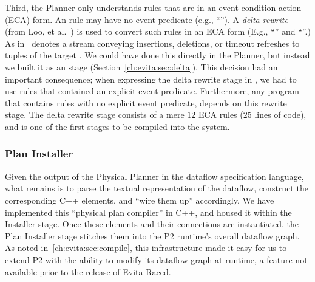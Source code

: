 
Third, the Planner only understands rules that are in an event-condition-action
(ECA) form.  An \OVERLOG rule may have no event predicate (e.g., ``'').  A {\em delta rewrite} (from Loo, et
al.~\cite{loo-sigmod06}) is used to convert such rules in an ECA form (E.g.,
``'' and ``''.) As in~\cite{loo-sigmod06}  denotes a
stream conveying insertions, deletions, or timeout refreshes to tuples of the
target .  We could have done this directly in the Planner, but
instead we built it as an \OVERLOG stage (Section~\ref{ch:evita:sec:delta}).
This decision had an important consequence; when expressing the delta rewrite
stage in \OVERLOG, we had to use rules that contained an explicit event
predicate.  Furthermore, any \OVERLOG program that contains rules with no
explicit event predicate, depends on this rewrite stage.  The delta rewrite
\OVERLOG stage consists of a mere $12$ ECA rules ($25$ lines of code), and is
one of the first \OVERLOG stages to be compiled into the system.
 

\subsubsection{Plan Installer}
\label{ch:evita:sec:installer}

Given the output of the Physical Planner in the dataflow specification
language, what remains is to parse the textual representation of the dataflow,
construct the corresponding C++ elements, and ``wire them up'' accordingly.  We
have implemented this ``physical plan compiler'' in C++, and housed it within
the Installer stage.  Once these elements and their connections are
instantiated, the Plan Installer stage stitches them into the P2 runtime's
overall dataflow graph.  As noted in~\ref{ch:evita:sec:compile}, this
infrastructure made it easy for us to extend P2 with the ability to modify its
dataflow graph at runtime, a feature not available prior to the release of
Evita Raced.

